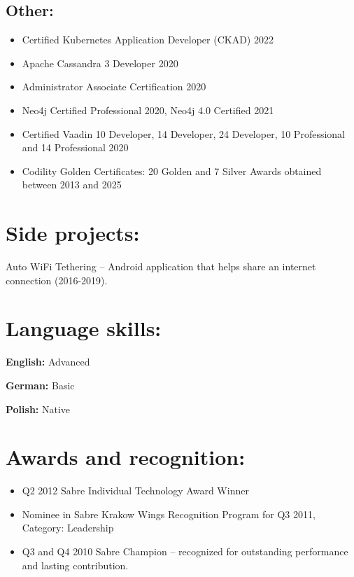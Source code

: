 \documentclass[11pt,a4paper]{article}
\begin{document}
\subsection*{Other:}
\begin{itemize}
    \item Certified Kubernetes Application Developer (CKAD) 2022
    \item Apache Cassandra 3 Developer 2020
    \item Administrator Associate Certification 2020
    \item Neo4j Certified Professional 2020, Neo4j 4.0 Certified 2021
    \item Certified Vaadin 10 Developer, 14 Developer, 24 Developer, 10 Professional and 14 Professional 2020
    \item Codility Golden Certificates: 20 Golden and 7 Silver Awards obtained between 2013 and 2025
\end{itemize}

\section*{Side projects:}
Auto WiFi Tethering -- Android application that helps share an internet connection (2016-2019).

\section*{Language skills:}
\textbf{English:} Advanced

\textbf{German:} Basic

\textbf{Polish:} Native

\section*{Awards and recognition:}
\begin{itemize}
    \item Q2 2012 Sabre Individual Technology Award Winner
    \item Nominee in Sabre Krakow Wings Recognition Program for Q3 2011, Category: Leadership
    \item Q3 and Q4 2010 Sabre Champion -- recognized for outstanding performance and lasting contribution.
\end{itemize}
\end{document}
